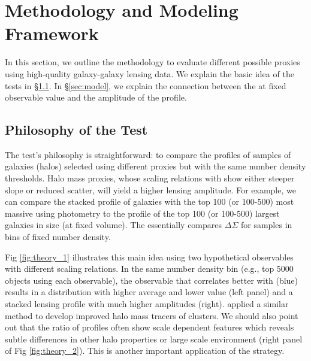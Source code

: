 \documentclass[fleqn,usenatbib,useAMS,english]{mnras}
\begin{document}


\section{Methodology and Modeling Framework}
    \label{sec:method}

    In this section, we outline the methodology to evaluate different possible \mvir{}
    proxies using high-quality galaxy-galaxy lensing data.
    We explain the basic idea of the \topn{} tests in \S \ref{sec:topn_intro}.
    In \S \ref{sec:model}, we explain the connection between the \sigmh{} at
    fixed observable value and the amplitude of the \dsigma{} profile.

\subsection{Philosophy of the \topn{} Test}
    \label{sec:topn_intro}

    The \topn{} test's philosophy is straightforward: to compare the \dsigma{}
    profiles of samples of galaxies (halos) selected using different \mvir{} proxies but with
    the same number density thresholds.
    Halo mass proxies, whose scaling relations with \mvir{} show either steeper slope or
    reduced scatter, will yield a higher lensing amplitude.
    For example, we can compare the stacked \dsigma{} profile of galaxies with
    the top 100 (or 100-500) most massive \mstar{} using \cmodel{} photometry to the profile
    of the top 100 (or 100-500) largest galaxies in size (at fixed volume). 
    The \topn{} essentially compares $\Delta\Sigma$ for samples in bins of fixed number density.

    Fig \ref{fig:theory_1} illustrates this main idea using two hypothetical observables with
    different \mvir{} scaling relations.
    In the same number density bin (e.g., top 5000 objects using each observable), the observable
    that correlates better with \mvir{} (blue) results in a \mvir{} distribution with higher
    average \mhalo{} and lower \sigmh{} value (left panel) and a stacked lensing profile with
    much higher amplitudes (right).
    \citet[][]{Reyes2008} applied a similar method to develop improved halo mass tracers
    of clusters.
    We should also point out that the ratio of \dsigma{} profiles often show scale dependent
    features which reveals subtle differences in other halo properties or large scale environment
    (right panel of Fig \ref{fig:theory_2}).
    This is another important application of the \topn{} strategy.
\end{document}
